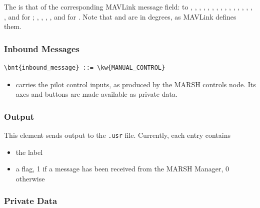 The  is that of the corresponding MAVLink message field:
 to , , , ,
, , , , , ,
, , , , ,
,  and  for ;
, , ,
,  and  for .
Note that  and  are in degrees, as MAVLink defines them.

\subsubsection{Inbound Messages}

\begin{Verbatim}[commandchars=\\\{\}]
    \bnt{inbound_message} ::= \kw{MANUAL_CONTROL}
\end{Verbatim}

\begin{itemize}
    \item {} carries the pilot control inputs, as produced
        by the MARSH controls node.
        Its axes and buttons are made available as private data.
\end{itemize}

\subsubsection{Output}

This element sends output to the \texttt{.usr} file.
Currently, each entry contains
\begin{itemize}
\item[1)] the label
\item[2)] a flag, 1 if a  message has been received from the
    MARSH Manager, 0 otherwise
\end{itemize}

\subsubsection{Private Data}

